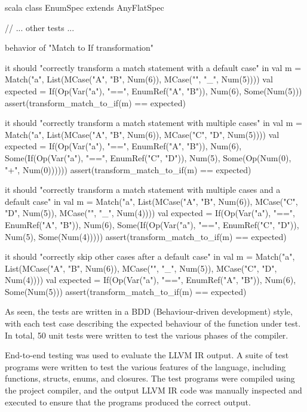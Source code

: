 \begin{code}{scala}
class EnumSpec extends AnyFlatSpec {
    // ... other tests ...

    behavior of "Match to If transformation"

    it should "correctly transform a match statement with a default case" in {
        val m = Match("a", List(MCase("A", "B", Num(6)), MCase("", "_", Num(5))))
        val expected = If(Op(Var("a"), "==", EnumRef("A", "B")), Num(6), Some(Num(5)))
        assert(transform_match_to_if(m) == expected)
    }

    it should "correctly transform a match statement with multiple cases" in {
        val m = Match("a", List(MCase("A", "B", Num(6)), MCase("C", "D", Num(5))))
        val expected = If(Op(Var("a"), "==", EnumRef("A", "B")), Num(6), Some(If(Op(Var("a"), "==", EnumRef("C", "D")), Num(5), Some(Op(Num(0), "+", Num(0))))))
        assert(transform_match_to_if(m) == expected)
    }

    it should "correctly transform a match statement with multiple cases and a default case" in {
        val m = Match("a", List(MCase("A", "B", Num(6)), MCase("C", "D", Num(5)), MCase("", "_", Num(4))))
        val expected = If(Op(Var("a"), "==", EnumRef("A", "B")), Num(6), Some(If(Op(Var("a"), "==", EnumRef("C", "D")), Num(5), Some(Num(4)))))
        assert(transform_match_to_if(m) == expected)
    }

    it should "correctly skip other cases after a default case" in {
        val m = Match("a", List(MCase("A", "B", Num(6)), MCase("", "_", Num(5)), MCase("C", "D", Num(4))))
        val expected = If(Op(Var("a"), "==", EnumRef("A", "B")), Num(6), Some(Num(5)))
        assert(transform_match_to_if(m) == expected)
    }
}
\end{code}

As seen, the tests are written in a BDD (Behaviour-driven development) style, with each test case
describing the expected behaviour of the function under test. In total, 50 unit tests were written
to test the various phases of the compiler.

End-to-end testing was used to evaluate the LLVM IR output. A suite of test programs
were written to test the various features of the language, including functions, structs, enums, and
closures. The test programs were compiled using the project compiler, and the output LLVM IR code
was manually inspected and executed to ensure that the programs produced the correct output.


